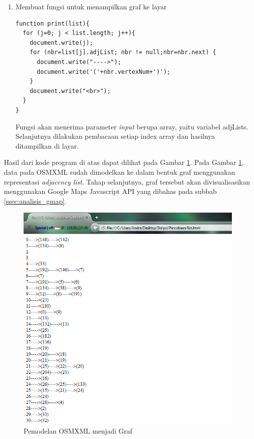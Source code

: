 \begin{enumerate}
  \item Membuat fungsi untuk menampilkan graf ke layar
\begin{verbatim}
function print(list){
  for (j=0; j < list.length; j++){
    document.write(j);
    for (nbr=list[j].adjList; nbr != null;nbr=nbr.next) {
      document.write("---->");
      document.write('('+nbr.vertexNum+')');
    }
    document.write("<br>");
  }
}
\end{verbatim}
  Fungsi akan menerima parameter \textit{input} berupa array, yaitu
  variabel adjLists. Selanjutnya dilakukan pembacaan setiap index array dan
  hasilnya ditampilkan di layar.
\end{enumerate}
Hasil dari kode program di atas dapat dilihat pada Gambar
\ref{fig:graf_analisis}.
Pada Gambar \ref{fig:graf_analisis}, data pada OSMXML sudah dimodelkan ke dalam
bentuk graf menggunakan representasi \textit{adjacency list}. Tahap
selanjutnya, graf tersebut akan divisualisasikan menggunakan Google Maps
Javascript API yang dibahas pada subbab \ref{ssec:analisis_gmap}.
\clearpage
\begin{figure}[h]
\centering
\includegraphics[scale=0.5]{Gambar/graf_analisis}
\caption[Pemodelan OSMXML menjadi Graf]{Pemodelan OSMXML menjadi Graf}
\label{fig:graf_analisis}
\end{figure}

